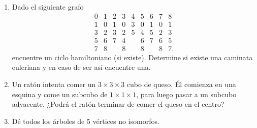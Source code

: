\documentclass[12pt,spanish,makeidx]{amsbook}
\theoremstyle{definition}
\theoremstyle{remark}
\begin{document}
\begin{enumerate}
\begin{enumerate}
 (i) (4) y (2),\quad

 (ii) (5) y (6), \quad

 (iii) (5) y (1).



\item Halle las componentes conexas del grafo (7).
\end{enumerate} 

\medskip

\item Dado el siguiente grafo
$$
\begin{matrix}
0&1&2&3&4&5&6&7&8\\ \hline
1&0&1&0&3&0&1&0&1\\
3&2&3&2&5&4&5&2&3\\
5&6&7&4&&6&7&6&5\\
7&8&&8&&8&&8&7.
\end{matrix}
$$
encuentre un ciclo hamiltoniano (si existe). Determine si existe una caminata euleriana y en caso de ser así encuentre una. 

\medskip

\item Un ratón intenta comer un $3\times 3\times 3$ cubo de queso. Él comienza en una esquina y come un subcubo de $1\times 1\times 1$, para luego pasar a un subcubo adyacente. ¿Podrá el ratón terminar de comer el queso en el centro?


\item Dé todos los árboles de 5 vértices no isomorfos.



\end{enumerate}
\end{document}
